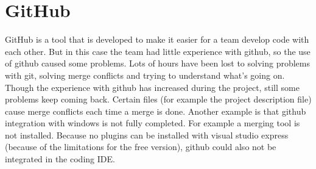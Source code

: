\section{GitHub}
GitHub is a tool that is developed to make it easier for a team develop code with each other. But in this case the team had little experience with github, so the use of github caused some problems. Lots of hours have been lost to solving problems with git, solving merge conflicts and trying to understand what’s going on. Though the experience with github has increased during the project, still some problems keep coming back. Certain files (for example the project description file) cause merge conflicts each time a merge is done. 
Another example is that github integration with windows is not fully completed. For example a merging tool is not installed. Because no plugins can be installed with visual studio express (because of the limitations for the free version), github could also not be integrated in the coding IDE.
